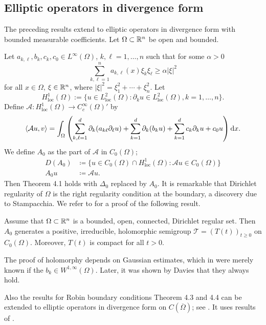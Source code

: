 \subsection{Elliptic operators in divergence form}
The preceding results extend to elliptic operators in divergence form with bounded measurable coefficients. Let $\Omega \subset \mathbb{R}^n$ be open and bounded.

Let $a_{k,\ell}, b_k, c_k, c_0 \in L^\infty(\Omega)$, $k, \ell = 1, \ldots, n$ such that for some $\alpha > 0$
\[
	\sum_{k,\ell=1}^n a_{k,\ell}(x)\xi_k\xi_\ell \geq \alpha|\xi|^2
\]
for all $x \in \Omega$, $\xi \in \mathbb{R}^n$, where $|\xi|^2 = \xi_1^2 + \cdots + \xi_n^2$.
Let 
%
\[
	H^1_{\text{loc}}(\Omega) := \{u \in L^2_{\text{loc}}(\Omega) \colon \partial_k u \in L^2_{\text{loc}}(\Omega), k = 1, \ldots, n\}.
\]
%
Define $\mathcal{A} \colon H^1_{\text{loc}}(\Omega) \to C_c^\infty(\Omega)'$ by
\[
	\langle \mathcal{A}u, v \rangle = \int_{\Omega}
		\left( \sum_{k,\ell=1}^d \partial_k(a_{k\ell}\partial_\ell u) + 
		\sum_{k=1}^d \partial_k(b_k u) + 
		\sum_{k=1}^d c_k \partial_k u + c_0 u \right) \mathop{}\!\mathrm{d}{x} .
\]
We define $A_0$ as the part of $\mathcal{A}$ in $C_0(\Omega)$; \ie
\begin{align*}
	D(A_0) &\coloneq \{u \in C_0(\Omega) \cap H^1_{\text{loc}}(\Omega) \colon \mathcal{A}u \in C_0(\Omega)\} \\
	A_0 u &\coloneq  \mathcal{A}u.
\end{align*}
Then Theorem 4.1 holds with $\Delta_0$ replaced by $A_0$. It is remarkable that Dirichlet regularity of $\Omega$ is the right regularity condition at the boundary, a discovery due to Stampacchia. We refer to  \citet[Section 4]{ArBe99} for a proof of the following result.

\begin{theorem}
Assume that $\Omega \subset \mathbb{R}^n$ is a bounded, open, connected, Dirichlet regular set. Then $A_0$ generates a positive, irreducible, holomorphic semigroup $\mathcal{T} = (T(t))_{t \geq 0}$ on $C_0(\Omega)$. Moreover, $T(t)$ is compact for all $t > 0$.
\end{theorem}

\begin{remark*}
The proof of holomorphy depends on Gaussian estimates, which in \citet{ArBe99} were merely known if the $b_k \in W^{1,\infty}(\Omega)$. Later, it was shown by Davies \citet{Da00} that they always hold.
\end{remark*}

Also the results for Robin boundary conditions Theorem 4.3 and 4.4 can be extended to elliptic operators in divergence form on $C(\overline{\Omega})$; see \citet[Theorem 4.5]{AEG20}. 
It uses results of \citet{Ni11}.
